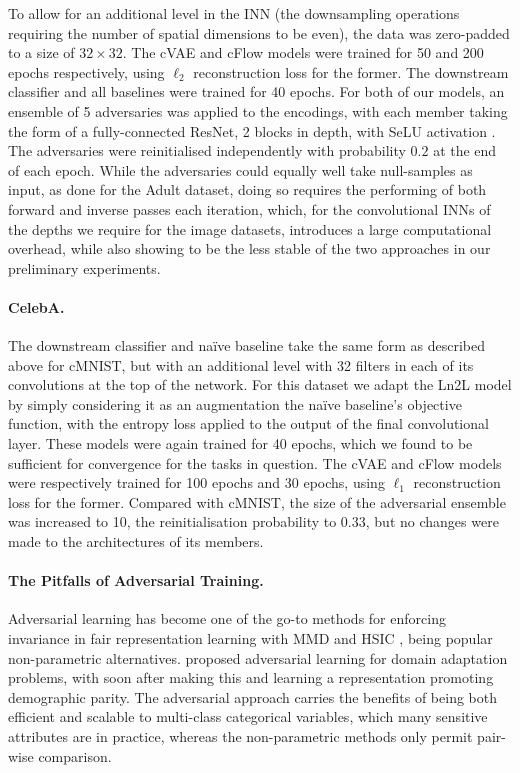 To allow for an additional level in the \ac{INN} (the downsampling operations requiring the number of spatial dimensions to be even), the data was zero-padded to a size of $32\times32$. The cVAE and cFlow models were trained for 50 and 200 epochs respectively, using $\ell_2$ reconstruction loss for the former. The downstream classifier and all baselines were trained for 40 epochs. For both of our models, an ensemble of 5 adversaries was applied to the encodings, with each member taking the form of a fully-connected ResNet, 2 blocks in depth, with SeLU activation \citep{klambauer2017self}. The adversaries were reinitialised independently with probability $0.2$ at the end of each epoch. While the adversaries could equally well take  null-samples as input, as done for the Adult dataset, doing so requires the performing of both forward and inverse passes each iteration, which, for the convolutional \acp{INN} of the depths we require for the image datasets, introduces a large computational overhead, while also showing to be the less stable of the two approaches in our preliminary experiments.

\paragraph{CelebA.} 
The downstream classifier and na\"ive baseline take the same form as described above for cMNIST, but with an additional level with 32 filters in each of its convolutions at the top of the network. For this dataset we adapt the Ln2L model by simply considering it as an augmentation the na\"ive baseline's objective function, with the entropy loss applied to the output of the final convolutional layer. These models were again trained for 40 epochs, which we found to be sufficient for convergence for the tasks in question. The cVAE and cFlow models were respectively trained for 100 epochs and 30 epochs, using $\ell_1$ reconstruction loss for the former. Compared with cMNIST, the size of the adversarial ensemble was increased to 10, the reinitialisation probability to 0.33, but no changes were made to the architectures of its members.

\paragraph{The Pitfalls of Adversarial Training.}
Adversarial learning has become one of the go-to methods for enforcing invariance in fair representation learning \citep{ganin2016domain} with MMD \citep{louizos2016variational} and HSIC \citep{QuaShaTho19}, being popular non-parametric alternatives.
\citet{ganin2016domain} proposed adversarial learning for domain adaptation problems, with \citet{edwards2016censoring} soon after making this and learning a representation promoting demographic parity.
The adversarial approach carries the benefits of being both efficient and scalable to multi-class categorical variables, which many sensitive attributes are in practice, whereas the non-parametric methods only permit pair-wise comparison.


